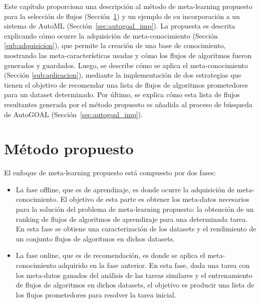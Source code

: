 Este capítulo proporciona una descripción al método de meta-learning propuesto para la selección de flujos (Sección~\ref{sec:proposal}) y un ejemplo de su incorporación a un sistema de AutoML (Sección~\ref{sec:autogoal_imp}). La propuesta es descrita explicando cómo ocurre la adquisición de meta-conocimiento (Sección \ref{sub:adquisicion}), que permite la creación de una base de conocimiento, mostrando las meta-características usadas y cómo los flujos de algoritmos fueron generados y guardados. Luego, se describe cómo se aplica el meta-conocimiento (Sección \ref{sub:aplicacion}), mediante la implementación de dos estrategias que tienen el objetivo de recomendar una lista de flujos de algoritmos prometedores para un dataset determinado. Por último, se explica cómo esta lista de flujos resultantes generada por el método propuesto es añadida al proceso de búsqueda de AutoGOAL (Sección~\ref{sec:autogoal_imp}).

\section{Método propuesto}\label{sec:proposal}

%

El enfoque de meta-learning propuesto está compuesto por dos fases:
\begin{itemize}
	\item La fase offline, que es de aprendizaje, es donde ocurre la adquisición de meta-conocimiento. El objetivo de esta parte es obtener los meta-datos necesarios para la solución del problema de meta-learning propuesto: la obtención de un ranking de flujos de algoritmos de aprendizaje para una determinada tarea. En esta fase se obtiene una caracterización de los datasets y el rendimiento de un conjunto flujos de algoritmos en dichos datasets.
	\item La fase online, que es de recomendación, es donde se aplica el meta-conocimiento adquirido en la fase anterior. En esta fase, dada una tarea con los meta-datos ganados del análisis de las tareas similares y el entrenamiento de flujos de algoritmos en dichos datasets, el objetivo es producir una lista de los flujos prometedores para resolver la tarea inicial.
\end{itemize}


